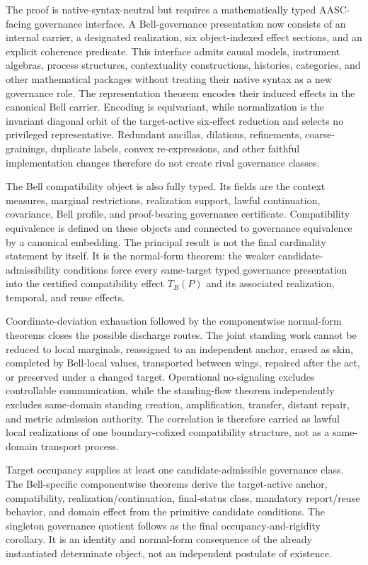 \documentclass[11pt]{article}
\theoremstyle{definition}
\begin{document}
The proof is native-syntax-neutral but requires a mathematically typed AASC-facing governance interface. A Bell-governance presentation now consists of an internal carrier, a designated realization, six object-indexed effect sections, and an explicit coherence predicate. This interface admits causal models, instrument algebras, process structures, contextuality constructions, histories, categories, and other mathematical packages without treating their native syntax as a new governance role. The representation theorem encodes their induced effects in the canonical Bell carrier. Encoding is equivariant, while normalization is the invariant diagonal orbit of the target-active six-effect reduction and selects no privileged representative. Redundant ancillas, dilations, refinements, coarse-grainings, duplicate labels, convex re-expressions, and other faithful implementation changes therefore do not create rival governance classes.

The Bell compatibility object is also fully typed. Its fields are the context measures, marginal restrictions, realization support, lawful continuation, covariance, Bell profile, and proof-bearing governance certificate. Compatibility equivalence is defined on these objects and connected to governance equivalence by a canonical embedding. The principal result is not the final cardinality statement by itself. It is the normal-form theorem: the weaker candidate-admissibility conditions force every same-target typed governance presentation into the certified compatibility effect $T_B(P)$ and its associated realization, temporal, and reuse effects.

Coordinate-deviation exhaustion followed by the componentwise normal-form theorems closes the possible discharge routes. The joint standing work cannot be reduced to local marginals, reassigned to an independent anchor, erased as skin, completed by Bell-local values, transported between wings, repaired after the act, or preserved under a changed target. Operational no-signaling excludes controllable communication, while the standing-flow theorem independently excludes same-domain standing creation, amplification, transfer, distant repair, and metric admission authority. The correlation is therefore carried as lawful local realizations of one boundary-cofixed compatibility structure, not as a same-domain transport process.

Target occupancy supplies at least one candidate-admissible governance class. The Bell-specific componentwise theorems derive the target-active anchor, compatibility, realization/continuation, final-status class, mandatory report/reuse behavior, and domain effect from the primitive candidate conditions. The singleton governance quotient follows as the final occupancy-and-rigidity corollary. It is an identity and normal-form consequence of the already instantiated determinate object, not an independent postulate of existence.
\end{document}

